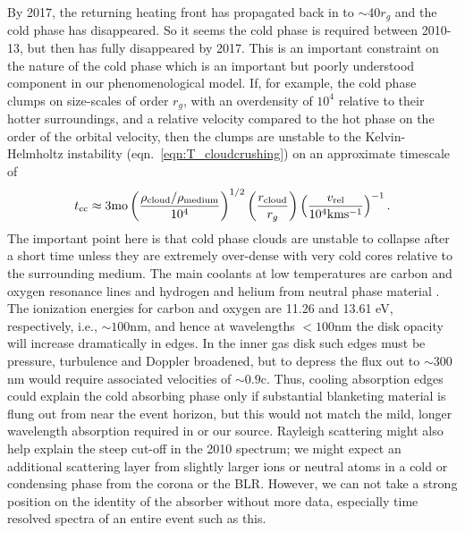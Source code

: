 \documentclass[a4paper,fleqn,usenatbib]{mnras}
\begin{document}
By 2017, the returning heating front has propagated back in to
$\sim$40$r_{g}$ and the cold phase has disappeared. So it seems the
cold phase is required between 2010-13, but then has fully disappeared
by 2017. This is an important constraint on the nature of the cold
phase which is an important but poorly understood component in our
phenomenological model. If, for example, the cold phase clumps on
size-scales of order $r_g$, with an overdensity of $10^{4}$ relative
to their hotter surroundings, and a relative velocity compared to the
hot phase on the order of the orbital velocity, then the clumps are
unstable to the Kelvin-Helmholtz instability
(eqn.~\ref{eqn:T_cloudcrushing}) on an approximate timescale of
\begin{equation}
t_{{\rm cc}} \approx 3{\rm mo} 
               \left( \frac{\rho_{\rm{cloud}}/\rho_{\rm{medium}}}{10^{4}}   \right)^{1/2}
               \left( \frac{r_{\rm cloud}}{r_{g}}\right) 
              \left( \frac{v_{\rm rel}}{10^{4}\rm{km s^{-1}}} \right)^{-1}.
\end{equation}
The important point here is that cold phase clouds are unstable to
collapse after a short time unless they are extremely over-dense with
very cold cores relative to the surrounding medium. The main coolants
at low temperatures are carbon and oxygen resonance lines and hydrogen
and helium from neutral phase material \citep[see e.g., Fig. 18 in
][]{Sutherland_Dopita1993}. The ionization energies for carbon and
oxygen are 11.26 and 13.61 eV, respectively, i.e., $\sim 100$nm, and
hence at wavelengths $<100$nm the disk opacity will increase
dramatically in edges. In the inner gas disk such edges must be
pressure, turbulence and Doppler broadened, but to depress the flux
out to $\sim 300$nm would require associated velocities of $\sim
0.9$c. Thus, cooling absorption edges could explain the cold absorbing
phase only if substantial blanketing material is flung out from near
the event horizon, but this would not match the mild, longer
wavelength absorption required in \citet{Guo2016} or our
source. Rayleigh scattering might also help explain the steep cut-off
in the 2010 spectrum; we might expect an additional scattering layer
from slightly larger ions or neutral atoms in a cold or condensing
phase from the corona or the BLR. However, we can not take a strong
position on the identity of the absorber without more data, especially
time resolved spectra of an entire event such as this.




\end{document}
